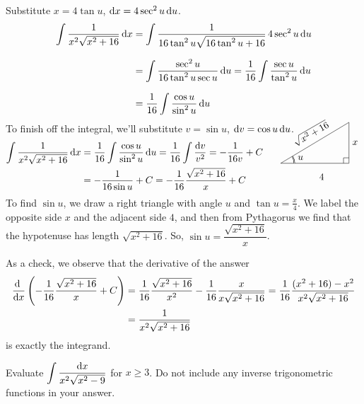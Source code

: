 \begin{solution} 
Substitute $x=4\tan u$, $\mathrm{d}x=4 \sec^2u\,\mathrm{d}u$.
\begin{align*}
\int\frac{1}{x^2\sqrt{x^2+16}}\,\mathrm{d}x
&=\int \frac{1}{16\tan^2 u \sqrt{16\tan^2 u+16}}\,4\sec^2 u\,\mathrm{d}u   \\[0.1in]
&=\int \frac{\sec^2u}{16\tan^2u\sec u}\,\mathrm{d}u
=\frac{1}{16}\int \frac{\sec u}{\tan^2u}\,\mathrm{d}u \\[0.1in]
&= \frac{1}{16}\int\frac{\cos u}{\sin^2 u}\,\mathrm{d}u
\end{align*}
To finish off the integral, we'll substitute $v=\sin u$, 
$\mathrm{d}v=\cos u\,\mathrm{d}u$.
\begin{align*}
\int\frac{1}{x^2\sqrt{x^2+16}}\,\dee{x}
&=\frac{1}{16} \int\frac{\cos u}{\sin^2 u}\,\dee{u}
= \frac{1}{16}\int\frac{\dee{v}}{v^2}
=-\frac{1}{16v} +C \\
&=-\frac{1}{16\sin u} +C 
=-\frac{1}{16}\dfrac{\sqrt{x^2+16}}{x}+C
\hskip0.5in\smash{
\trigtri{u}{4}{x}{\sqrt{x^2+16}}
} 
\end{align*}
To find $\sin u$, we draw a right triangle with angle $u$ and $\tan u = \frac{x}{4}$. We label the opposite side $x$ and the adjacent side $4$, and then from Pythagorus we find that the hypotenuse has length $\sqrt{x^2+16}$. So, $\sin u = \dfrac{\sqrt{x^2+16}}{x}$.

As a check, we observe that the derivative of the answer
\begin{align*}
\diff{}{x}\left(-\frac{1}{16}\frac{\sqrt{x^2+16}}{x}+C\right)
&=\frac{1}{16}\frac{\sqrt{x^2+16}}{x^2} 
       -\frac{1}{16}\frac{x}{x\sqrt{x^2+16}}
=\frac{1}{16}\frac{(x^2+16)-x^2}{x^2\sqrt{x^2+16}} \\
&=\frac{1}{x^2\sqrt{x^2+16}}
\end{align*}
is exactly the integrand.

\end{solution}

\begin{question}[2016A]
Evaluate $\displaystyle\int \frac{\mathrm{d}x}{x^2\sqrt{x^2-9}}$ for $x\ge 3$.
Do not include any inverse trigonometric functions in your answer.
\end{question}

